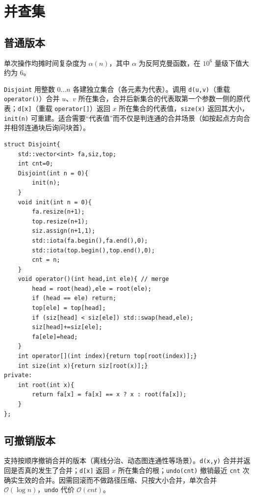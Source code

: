 \section{并查集}

\subsection{普通版本}

单次操作均摊时间复杂度为 $\alpha(n)$，其中 $\alpha$ 为反阿克曼函数，在 $10^6$ 量级下值大约为 $6$。

\texttt{Disjoint} 用整数 $0\dots n$ 各建独立集合（各元素为代表）。调用 \texttt{d(u,v)}（重载 \texttt{operator()}）合并 $u$、$v$ 所在集合，合并后新集合的代表取第一个参数一侧的原代表；\texttt{d[x]}（重载 \texttt{operator[]}）返回 $x$ 所在集合的代表值，\texttt{size(x)} 返回其大小，\texttt{init(n)} 可重建。适合需要“代表值”而不仅是判连通的合并场景（如按起点方向合并相邻连通块后询问块首）。

\begin{lstlisting}
struct Disjoint{
    std::vector<int> fa,siz,top;
    int cnt=0;
    Disjoint(int n = 0){
        init(n);
    }
    void init(int n = 0){
        fa.resize(n+1);
        top.resize(n+1);
        siz.assign(n+1,1);
        std::iota(fa.begin(),fa.end(),0);
        std::iota(top.begin(),top.end(),0);
        cnt = n;
    }
    void operator()(int head,int ele){ // merge
        head = root(head),ele = root(ele);
        if (head == ele) return;
        top[ele] = top[head];
        if (siz[head] < siz[ele]) std::swap(head,ele);
        siz[head]+=siz[ele];
        fa[ele]=head;
    }
    int operator[](int index){return top[root(index)];}
    int size(int x){return siz[root(x)];}
private:
    int root(int x){
        return fa[x] = fa[x] == x ? x : root(fa[x]);
    }
};
\end{lstlisting}

\subsection{可撤销版本}

\noindent 支持按顺序撤销合并的版本（离线分治、动态图连通性等场景）。\texttt{d(x,y)} 合并并返回是否真的发生了合并；\texttt{d[x]} 返回 $x$ 所在集合的根；\texttt{undo(cnt)} 撤销最近 \texttt{cnt} 次确实生效的合并。因需回滚而不做路径压缩、只按大小合并，单次合并 $\mathcal{O}(\log n)$，\texttt{undo} 代价 $\mathcal{O}(\textit{cnt})$。


